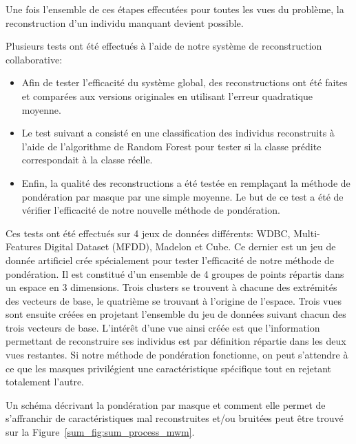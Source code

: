     Une fois l'ensemble de ces étapes effecutées pour toutes les vues du problème, la reconstruction d'un individu manquant devient possible.

    Plusieurs tests ont été effectués à l'aide de notre système de reconstruction collaborative:
    \begin{itemize}
        \item Afin de tester l'efficacité du système global, des reconstructions ont été faites et comparées aux versions originales en utilisant l'erreur quadratique moyenne.
        \item Le test suivant a consisté en une classification des individus reconstruits à l'aide de l'algorithme de Random Forest pour tester si la classe prédite correspondait à la classe réelle.
        \item Enfin, la qualité des reconstructions a été testée en remplaçant la méthode de pondération par masque par une simple moyenne. Le but de ce test a été de vérifier l'efficacité de notre nouvelle méthode de pondération.
    \end{itemize}

    Ces tests ont été effectués sur 4 jeux de données différents: WDBC, Multi-Features Digital Dataset (MFDD), Madelon et Cube. Ce dernier est un jeu de donnée artificiel crée spécialement pour tester l'efficacité de notre méthode de pondération. Il est constitué d'un ensemble de 4 groupes de points répartis dans un espace en 3 dimensions. Trois clusters se trouvent à chacune des extrémités des vecteurs de base, le quatrième se trouvant à l'origine de l'espace. Trois vues sont ensuite créées en projetant l'ensemble du jeu de données suivant chacun des trois vecteurs de base. L'intérêt d'une vue ainsi créée est que l'information permettant de reconstruire ses individus est par définition répartie dans les deux vues restantes. Si notre méthode de pondération fonctionne, on peut s'attendre à ce que les masques privilégient une caractéristique spécifique tout en rejetant totalement l'autre.
    
    Un schéma décrivant la pondération par masque et comment elle permet de s'affranchir de caractéristiques mal reconstruites et/ou bruitées peut être trouvé sur la Figure~\ref{sum_fig:sum_process_mwm}.

